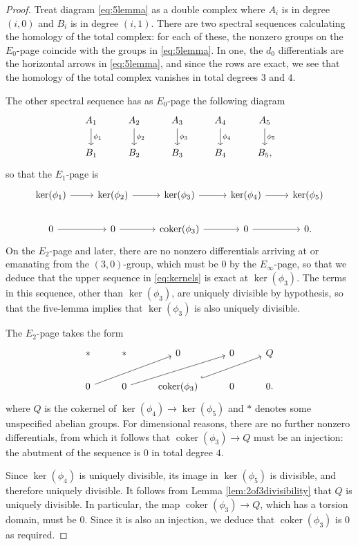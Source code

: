\documentclass[10pt,a4paper]{amsart}
\newcommand{\coker}{\operatorname{coker}}
\begin{document}
\begin{proof}
  Treat diagram \eqref{eq:5lemma} as a double complex where $A_i$ is in degree $(i,0)$ and $B_i$ is in degree $(i,1)$. There are two spectral sequences calculating the homology of the total complex: for each of these, the nonzero groups on the $E_0$-page coincide with the groups in \eqref{eq:5lemma}. In one, the $d_0$ differentials are the horizontal arrows in \eqref{eq:5lemma}, and since the rows are exact, we see that the homology of the total complex vanishes in total degrees $3$ and $4$.

  The other spectral sequence has as $E_0$-page the following diagram
   \begin{equation*}
    \begin{tikzcd}
      A_1 \dar{\phi_1}  & A_2 \dar{\phi_2}  & A_3 \dar{\phi_3}  & A_4 \dar{\phi_4}  & A_5 \dar{\phi_5} \\
      B_1  & B_2  & B_3  & B_4 &  B_5,
    \end{tikzcd}
  \end{equation*}
  so that the $E_1$-page is
  \begin{equation}
    \begin{tikzcd}\label{eq:kernels}
      \ker(\phi_1) \rar & \ker(\phi_2) \rar & \ker(\phi_3) \rar & \ker(\phi_4) \rar & \ker(\phi_5) \\
      0 \rar & 0 \rar & \coker(\phi_3) \rar & 0 \rar  & 0.
    \end{tikzcd}
  \end{equation}
  On the $E_2$-page and later, there are no nonzero differentials arriving at or emanating from the $(3,0)$-group, which must be $0$ by the $E_\infty$-page, so that we deduce that the upper sequence in \eqref{eq:kernels} is exact at $\ker(\phi_3)$. The terms in this sequence, other than $\ker(\phi_3)$, are uniquely divisible by hypothesis, so that the five-lemma implies that $\ker(\phi_3)$ is also uniquely divisible.

  The $E_2$-page takes the form
  \[
  \begin{tikzcd}\label{eq:E2}
     \ast  & \ast   & 0  & 0  & Q \\
      0 \arrow[urr] & 0 \arrow[urr] & \coker(\phi_3) \arrow[urr, hook]  & 0   & 0.
    \end{tikzcd} 
  \]
  where $Q$ is the cokernel of $\ker(\phi_4) \to \ker(\phi_5)$ and $\ast$ denotes some unspecified abelian groups. For dimensional reasons, there are no further nonzero differentials, from which it follows that $\coker(\phi_3) \to Q$ must be an injection: the abutment of the sequence is $0$ in total degree $4$.

  Since $\ker(\phi_4)$ is uniquely divisible, its image in $\ker(\phi_5)$ is divisible, and therefore uniquely divisible. It follows from Lemma \ref{lem:2of3divisibility} that $Q$ is uniquely divisible. In particular, the map $\coker(\phi_3) \to Q$, which has a torsion domain, must be $0$. Since it is also an injection, we deduce that $\coker(\phi_3)$ is $0$ as required.
\end{proof}
\end{document}
